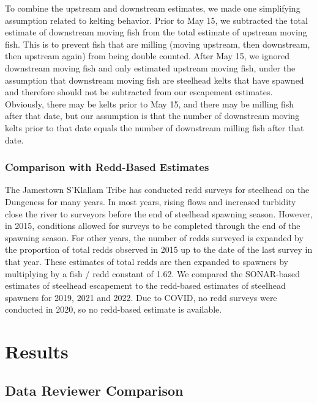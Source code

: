 \documentclass[
]{article}
\begin{document}
To combine the upstream and downstream estimates, we made one simplifying assumption related to kelting behavior. Prior to May 15, we subtracted the total estimate of downstream moving fish from the total estimate of upstream moving fish. This is to prevent fish that are milling (moving upstream, then downstream, then upstream again) from being double counted. After May 15, we ignored downstream moving fish and only estimated upstream moving fish, under the assumption that downstream moving fish are steelhead kelts that have spawned and therefore should not be subtracted from our escapement estimates. Obviously, there may be kelts prior to May 15, and there may be milling fish after that date, but our assumption is that the number of downstream moving kelts prior to that date equals the number of downstream milling fish after that date.

\hypertarget{comparison-with-redd-based-estimates}{%
\subsubsection{Comparison with Redd-Based Estimates}\label{comparison-with-redd-based-estimates}}

The Jamestown S'Klallam Tribe has conducted redd surveys for steelhead on the Dungeness for many years. In most years, rising flows and increased turbidity close the river to surveyors before the end of steelhead spawning season. However, in 2015, conditions allowed for surveys to be completed through the end of the spawning season. For other years, the number of redds surveyed is expanded by the proportion of total redds observed in 2015 up to the date of the last survey in that year. These estimates of total redds are then expanded to spawners by multiplying by a fish / redd constant of 1.62. We compared the SONAR-based estimates of steelhead escapement to the redd-based estimates of steelhead spawners for 2019, 2021 and 2022. Due to COVID, no redd surveys were conducted in 2020, so no redd-based estimate is available.

\FloatBarrier

\hypertarget{results}{%
\section{Results}\label{results}}

\hypertarget{data-reviewer-comparison-1}{%
\subsection{Data Reviewer Comparison}\label{data-reviewer-comparison-1}}
\end{document}
